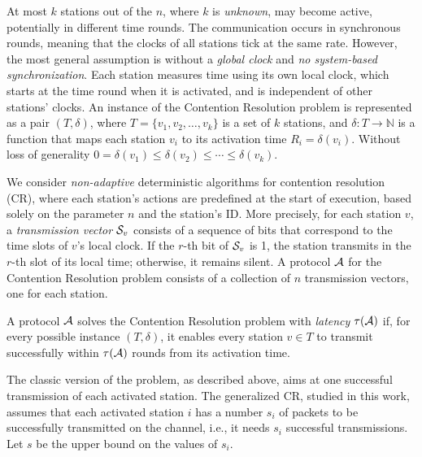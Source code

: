 \documentclass[11pt]{article}
\begin{document}
At most $k$ stations out of the $n$, where $k$ is {\em unknown}, may become active, 
potentially in different time rounds.
The communication occurs in synchronous rounds, meaning that the clocks of all stations tick at the same rate. 
However, the most general assumption is without a \textit{global clock} and \textit{no system-based synchronization}. 
Each station measures time using its own local clock, which starts at the time round when it is 
activated, and is independent of other stations' clocks.
An instance of the Contention Resolution problem is represented as a 
pair $(T, \delta)$, where $T = \{v_1, v_2, \ldots, v_k\}$ is a set of $k$ stations, and $\delta: T \rightarrow \mathbb{N}$ 
is a function that maps each station $v_i$ to its activation time $R_i = \delta(v_i)$.
Without loss of generality 
$0 = \delta(v_1) \le \delta(v_2) \le \cdots \le \delta(v_k)$.

We consider {\em non-adaptive} deterministic algorithms for contention resolution (CR), 
where each station's actions are predefined at the start of execution, based solely on the parameter $n$ and the station's ID.
More precisely,
for each station $v$,  a \textit{transmission vector} ${\cal S}_v$ consists of a sequence of bits that correspond to the time slots of $v$'s local clock. 
If the $r$-th bit of ${\cal S}_v$ is 1, the station transmits in the $r$-th slot of its local time; otherwise, it remains silent.
A protocol ${\cal A}$ for the Contention Resolution problem consists of a collection of $n$ transmission vectors, one for each station.

A protocol ${\cal A}$ solves the Contention Resolution problem with \textit{latency} $\tau({\cal A})$ if, for every possible instance $(T, \delta)$, 
it enables every station $v \in T$ to transmit successfully within $\tau({\cal A})$ rounds from its activation time.

The classic version of the problem, as described above, aims at one successful transmission of each activated station. The generalized CR, studied in this work, assumes that each activated station $i$ has a number $s_i$ of packets to be successfully transmitted on the channel, i.e., it needs $s_i$ successful transmissions. Let $s$ be the upper bound on the values of $s_i$.
\end{document}
